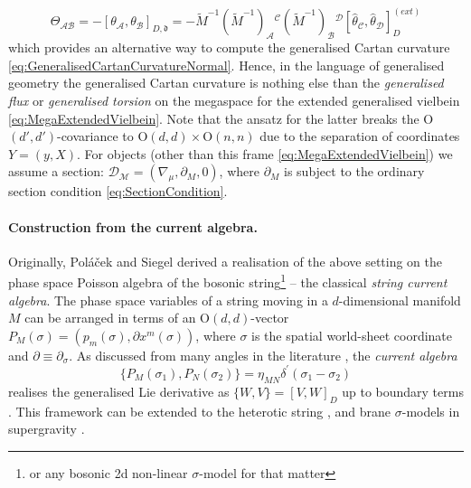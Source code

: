 \documentclass[11pt,a4paper]{article}
\numberwithin{equation}{section}
\begin{document}
\begin{equation}
  \Theta_{\mathcal{A} \mathcal{B}} = - [\theta_{\mathcal{A}}, \theta_{\mathcal{B}} ]_{D,\mathfrak{d}} = - \widetilde{M}^{-1} (\widetilde{M}^{-1})_{\mathcal{A}}{}^{\mathcal{C}} (\widetilde{M}^{-1})_{\mathcal{B}}{}^{\mathcal{D}} [\widehat{\theta}_{\mathcal{C}} , \widehat{\theta}_{\mathcal{D}} ]_D^{(ext)}
\end{equation}
which provides an alternative way to compute the generalised Cartan curvature \eqref{eq:GeneralisedCartanCurvatureNormal}. Hence, in the language of generalised geometry the generalised Cartan curvature is nothing else than the \textit{generalised flux} or \textit{generalised torsion} on the megaspace for the extended generalised vielbein \eqref{eq:MegaExtendedVielbein}. Note that the ansatz for the latter breaks the O$(d',d')$-covariance to O$(d,d) \times$O$(n,n)$ due to the separation of coordinates $Y = (y,X)$. For objects (other than this frame \eqref{eq:MegaExtendedVielbein}) we assume a section: $\mathcal{D}_\mathcal{M} = (\nabla_\mu , \partial_M , 0)$, where $\partial_M$ is subject to the ordinary section condition \eqref{eq:SectionCondition}.

\paragraph{Construction from the current algebra.} Originally, Poláček and Siegel \cite{Polacek:2013nla} derived a realisation of the above setting on the phase space Poisson algebra of the bosonic string\footnote{or any bosonic 2d non-linear $\sigma$-model for that matter} -- the classical \textit{string current algebra}. The phase space variables of a string moving in a $d$-dimensional manifold $M$ can be arranged in terms of an O$(d,d)$-vector $P_M(\sigma) = (p_m(\sigma) , \partial x^m(\sigma) )$, where $\sigma$ is the spatial world-sheet coordinate and $\partial \equiv \partial_\sigma$. As discussed from many angles in the literature \cite{Duff:1989tf,Tseytlin:1990nb,Tseytlin:1990va,Siegel:1993bj,Siegel:1993th,Klimcik:1995ux,Sfetsos:1999cc,Blair:2014kla,Demulder:2018lmj,Osten:2019ayq,Hassler:2020xyj,Borsato:2021gma,Borsato:2021vfy}, the \textit{current algebra}
\begin{equation}
    \{ P_M (\sigma_1) , P_N (\sigma_2) \} = \eta_{MN} \delta^\prime (\sigma_1-\sigma_2) \label{eq:CurrentAlgebraFlatNotExtended}
\end{equation}
realises the generalised Lie derivative as $\{ W , V \} = [V,W]_D$ up to boundary terms \cite{Osten:2019ayq}. 
This framework can be extended to the heterotic string \cite{Hatsuda:2022zpi,Osten:2023cza}, and brane $\sigma$-models in supergravity \cite{Osten:2021fil,Osten:2024mjt}.
\end{document}
